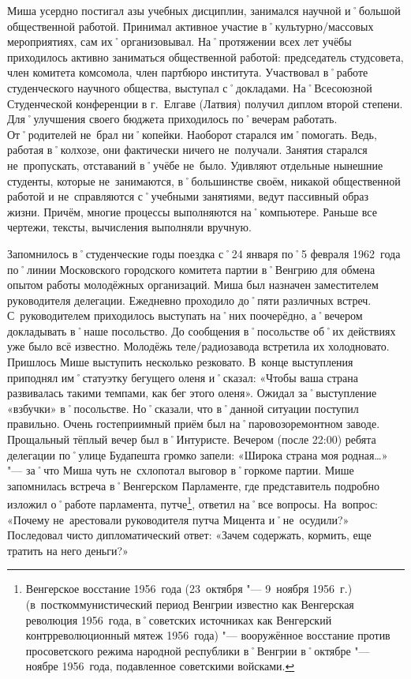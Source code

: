 Миша усердно постигал азы учебных дисциплин, занимался научной и˚большой общественной работой. Принимал активное участие в˚культурно\-/массовых мероприятиях, сам их˚организовывал. На˚протяжении всех лет учёбы приходилось активно заниматься общественной работой: председатель студсовета, член комитета комсомола, член партбюро института. Участвовал в˚работе студенческого научного общества, выступал с˚докладами. На˚Всесоюзной Студенческой конференции в г.~Елгаве (Латвия) получил диплом второй степени. Для˚улучшения своего бюджета приходилось по˚вечерам работать. От˚родителей не~брал ни˚копейки. Наоборот старался им˚помогать. Ведь, работая в˚колхозе, они фактически ничего не~получали. Занятия старался не~пропускать, отставаний в˚учёбе не~было. Удивляют отдельные нынешние студенты, которые не~занимаются, в˚большинстве своём, никакой общественной работой и не~справляются с˚учебными занятиями, ведут пассивный образ жизни. Причём, многие процессы выполняются на˚компьютере. Раньше все чертежи, тексты, вычисления выполняли вручную.

Запомнилось в˚студенческие годы поездка с˚24 января по˚5 февраля 1962~года по˚линии Московского городского комитета партии в˚Венгрию для обмена опытом работы молодёжных организаций. Миша был назначен заместителем руководителя делегации. Ежедневно проходило до˚пяти различных встреч. С~руководителем приходилось выступать на˚них поочерёдно, а˚вечером докладывать в˚наше посольство. До сообщения в˚посольстве об˚их действиях уже было всё известно. Молодёжь теле\-/радиозавода встретила их холодновато. Пришлось Мише выступить несколько резковато. В~конце выступления приподнял им˚статуэтку бегущего оленя и˚сказал: «Чтобы ваша страна развивалась такими темпами, как бег этого оленя». Ожидал за˚выступление «взбучки» в˚посольстве. Но˚сказали, что в˚данной ситуации поступил правильно. Очень гостеприимный приём был на˚паровозоремонтном заводе. Прощальный тёплый вечер был в˚Интуристе. Вечером (после 22:00) ребята делегации по˚улице Будапешта громко запели: «Широка страна моя родная…» "--- за˚что Миша чуть не~схлопотал выговор в˚горкоме партии. Мише запомнилась встреча в˚Венгерском Парламенте, где представитель подробно изложил о˚работе парламента, путче\footnote{Венгерское восстание 1956~года (23~октября "--- 9~ноября 1956~г.) (в~посткоммунистический период Венгрии известно как Венгерская революция 1956~года, в˚советских источниках как Венгерский контрреволюционный мятеж 1956~года) "--- вооружённое восстание против просоветского режима народной республики в˚Венгрии в˚октябре "--- ноябре 1956~года, подавленное советскими войсками.}, ответил на˚все вопросы. На~вопрос: «Почему не~арестовали руководителя путча Мицента и˚не~осудили?» Последовал чисто дипломатический ответ: «Зачем содержать, кормить, еще тратить на него деньги?»


